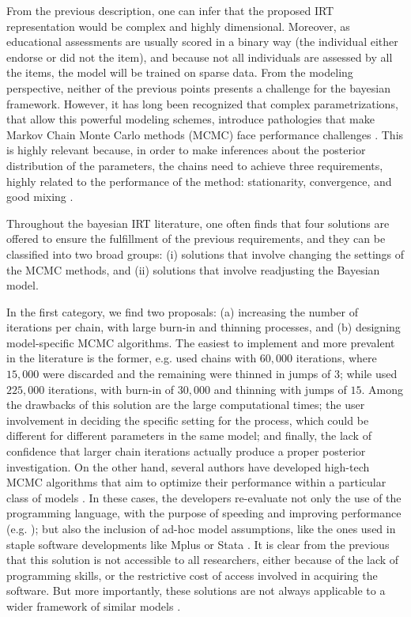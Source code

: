 From the previous description, one can infer that the proposed IRT representation would be complex and highly dimensional. Moreover, as educational assessments are usually scored in a binary way (the individual either endorse or did not the item), and because not all individuals are assessed by all the items, the model will be trained on sparse data. From the modeling perspective, neither of the previous points presents a challenge for the bayesian framework. However, it has long been recognized that complex parametrizations, that allow this powerful modeling schemes, introduce pathologies that make Markov Chain Monte Carlo methods (MCMC)  face performance challenges \cite{Gelfand_et_al_1995, Gelfand_et_al_1996, Papaspiliopoulos_et_al_2003, Papaspiliopoulos_et_al_2007, Betancourt_et_al_2013}. This is highly relevant because, in order to make inferences about the posterior distribution of the parameters, the chains need to achieve three requirements, highly related to the performance of the method: stationarity, convergence, and good mixing \cite{McElreath_2020}.

Throughout the bayesian IRT literature, one often finds that four solutions are offered to ensure the fulfillment of the previous requirements, and they can be classified into two broad groups: (i) solutions that involve changing the settings of the MCMC methods, and (ii) solutions that involve readjusting the Bayesian model. 

In the first category, we find two proposals: (a) increasing the number of iterations per chain, with large burn-in and thinning processes, and (b) designing model-specific MCMC algorithms. The easiest to implement and more prevalent in the literature is the former, e.g. \citet{Fujimoto_2018a} used chains with $60,000$ iterations, where $15,000$ were discarded and the remaining were thinned in jumps of $3$; while \citet{Fujimoto_2018b} used $225,000$ iterations, with burn-in of $30,000$ and thinning with jumps of $15$. Among the drawbacks of this solution are the large computational times; the user involvement in deciding the specific setting for the process, which could be different for different parameters in the same model; and finally, the lack of confidence that larger chain iterations actually produce a proper posterior investigation. On the other hand, several authors have developed high-tech MCMC algorithms that aim to optimize their performance within a particular class of models \cite{Papaspiliopoulos_et_al_2007}. In these cases, the developers re-evaluate not only the use of the programming language, with the purpose of speeding and improving performance (e.g. \citet{Fujimoto_2018a}); but also the inclusion of ad-hoc model assumptions, like the ones used in staple software developments like Mplus \cite{Muthen_et_al_2011} or Stata \cite{Rabe_et_al_2004c}. It is clear from the previous that this solution is not accessible to all researchers, either because of the lack of programming skills, or the restrictive cost of access involved in acquiring the software. But more importantly, these solutions are not always applicable to a wider framework of similar models \cite{Papaspiliopoulos_et_al_2007}.

